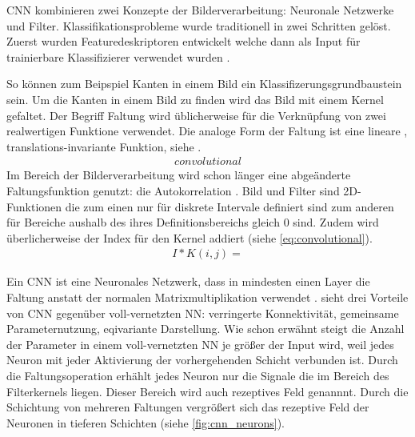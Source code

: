 CNN kombinieren zwei Konzepte der Bilderverarbeitung: Neuronale Netzwerke und Filter.
Klassifikationsprobleme wurde traditionell in zwei Schritten gelöst. Zuerst wurden 
Featuredeskriptoren entwickelt welche dann als Input für trainierbare Klassifizierer 
verwendet wurden \autocite[2353]{RawatDeepConvolutionalNeural2017}.


So können zum Beipspiel Kanten in einem Bild ein Klassifizerungsgrundbaustein sein. 
Um die Kanten in einem Bild zu finden wird das Bild mit einem Kernel  gefaltet.  
Der Begriff Faltung wird üblicherweise für die Verknüpfung von zwei realwertigen Funktione verwendet. Die analoge Form der Faltung ist eine lineare , translations-invariante Funktion, siehe \cite[28]{SusseBildverarbeitungundObjekterkennung2014}. 
\begin{align}
    \label{eq:convolutional}
    convolutional
\end{align}
Im Bereich der Bilderverarbeitung wird schon länger eine abgeänderte Faltungsfunktion genutzt: die Autokorrelation . Bild und Filter sind 2D-Funktionen die zum einen nur für diskrete Intervale definiert sind zum anderen für Bereiche aushalb des ihres Definitionsbereichs gleich 0 sind. Zudem wird überlicherweise der Index für den Kernel addiert (siehe \cref{eq:convolutional}).
\begin{align}
    \label{eq:crosscorrelation}
    I*K(i,j) =
\end{align}


Ein CNN ist eine Neuronales Netzwerk, dass in mindesten einen Layer die Faltung anstatt der normalen Matrixmultiplikation verwendet \parencite[321]{GoodfellowDeeplearning2016}.
\cite{GoodfellowDeeplearning2016} sieht drei Vorteile von CNN gegenüber voll-vernetzten NN: verringerte Konnektivität, 
gemeinsame Parameternutzung, eqivariante Darstellung.
Wie schon erwähnt steigt die Anzahl der Parameter in einem voll-vernetzten NN je größer der Input wird, weil jedes Neuron mit jeder Aktivierung der vorhergehenden Schicht verbunden ist. 
Durch die Faltungsoperation erhählt jedes Neuron nur die Signale die im Bereich des Filterkernels liegen. Dieser Bereich wird auch rezeptives Feld genannnt.
Durch die Schichtung von mehreren Faltungen vergrößert sich das rezeptive Feld der Neuronen in tieferen Schichten (siehe \cref{fig:cnn_neurons}).


